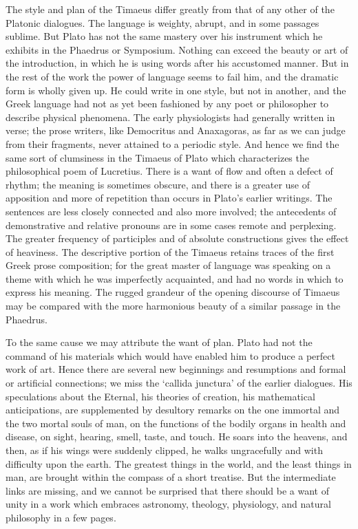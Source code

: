 The style and plan of the Timaeus differ greatly from that of any other of
the Platonic dialogues. The language is weighty, abrupt, and in some
passages sublime. But Plato has not the same mastery over his instrument
which he exhibits in the Phaedrus or Symposium. Nothing can exceed the
beauty or art of the introduction, in which he is using words after his
accustomed manner. But in the rest of the work the power of language seems
to fail him, and the dramatic form is wholly given up. He could write in
one style, but not in another, and the Greek language had not as yet been
fashioned by any poet or philosopher to describe physical phenomena. The
early physiologists had generally written in verse; the prose writers,
like Democritus and Anaxagoras, as far as we can judge from their
fragments, never attained to a periodic style. And hence we find the same
sort of clumsiness in the Timaeus of Plato which characterizes the
philosophical poem of Lucretius. There is a want of flow and often a
defect of rhythm; the meaning is sometimes obscure, and there is a greater
use of apposition and more of repetition than occurs in Plato’s earlier
writings. The sentences are less closely connected and also more involved;
the antecedents of demonstrative and relative pronouns are in some cases
remote and perplexing. The greater frequency of participles and of
absolute constructions gives the effect of heaviness. The descriptive
portion of the Timaeus retains traces of the first Greek prose
composition; for the great master of language was speaking on a theme with
which he was imperfectly acquainted, and had no words in which to express
his meaning. The rugged grandeur of the opening discourse of Timaeus may
be compared with the more harmonious beauty of a similar passage in the
Phaedrus.

To the same cause we may attribute the want of plan. Plato had not the
command of his materials which would have enabled him to produce a perfect
work of art. Hence there are several new beginnings and resumptions and
formal or artificial connections; we miss the ‘callida junctura’ of the
earlier dialogues. His speculations about the Eternal, his theories of
creation, his mathematical anticipations, are supplemented by desultory
remarks on the one immortal and the two mortal souls of man, on the
functions of the bodily organs in health and disease, on sight, hearing,
smell, taste, and touch. He soars into the heavens, and then, as if his
wings were suddenly clipped, he walks ungracefully and with difficulty
upon the earth. The greatest things in the world, and the least things in
man, are brought within the compass of a short treatise. But the
intermediate links are missing, and we cannot be surprised that there
should be a want of unity in a work which embraces astronomy, theology,
physiology, and natural philosophy in a few pages.


